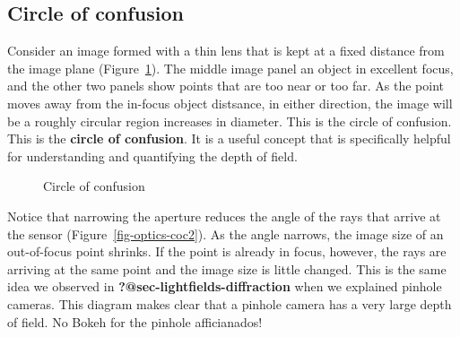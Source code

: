 \documentclass[
  letterpaper,
]{book}
\begin{document}
\subsection{Circle of confusion}\label{sec-optics-coc}

Consider an image formed with a thin lens that is kept at a fixed
distance from the image plane (Figure~\ref{fig-optics-coc1}). The middle
image panel an object in excellent focus, and the other two panels show
points that are too near or too far. As the point moves away from the
in-focus object distsance, in either direction, the image will be a
roughly circular region increases in diameter. This is the circle of
confusion. This is the \textbf{circle of confusion}. It is a useful
concept that is specifically helpful for understanding and quantifying
the depth of field.

\begin{figure}


\caption{\label{fig-optics-coc1}Circle of confusion}

\end{figure}%

Notice that narrowing the aperture reduces the angle of the rays that
arrive at the sensor (Figure~\ref{fig-optics-coc2}). As the angle
narrows, the image size of an out-of-focus point shrinks. If the point
is already in focus, however, the rays are arriving at the same point
and the image size is little changed. This is the same idea we observed
in \textbf{?@sec-lightfields-diffraction} when we explained pinhole
cameras. This diagram makes clear that a pinhole camera has a very large
depth of field. No Bokeh for the pinhole afficianados!
\end{document}
